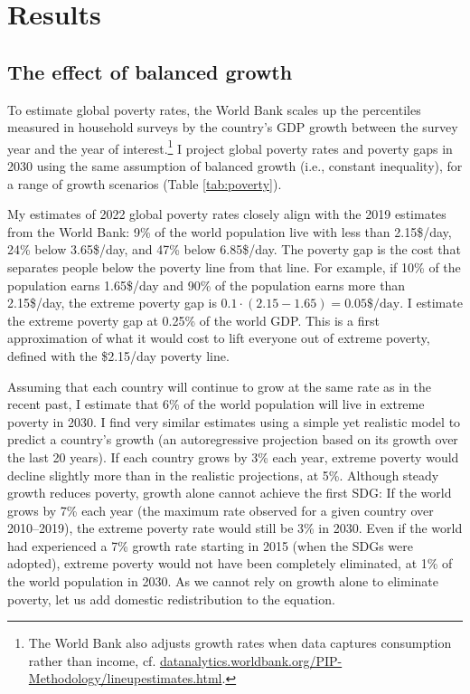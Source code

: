\section{Results}
\subsection{The effect of balanced growth}

To estimate global poverty rates, the World Bank scales up the percentiles measured in household surveys by the country's GDP growth between the survey year and the year of interest.\footnote{The World Bank also adjusts growth rates when data captures consumption rather than income, cf. \href{https://datanalytics.worldbank.org/PIP-Methodology/lineupestimates.html\#extrapolations}{datanalytics.worldbank.org/PIP-Methodology/lineupestimates.html}.} I project global poverty rates and poverty gaps in 2030 using the same assumption of balanced growth (i.e., constant inequality), for a range of growth scenarios (Table \ref{tab:poverty}). 



My estimates of 2022 global poverty rates closely align with the 2019 estimates from the World Bank: 9\% of the world population live with less than 2.15\$/day, 24\% below 3.65\$/day, and 47\% below 6.85\$/day. 
The poverty gap is the cost that separates people below the poverty line from that line. For example, if 10\% of the population earns 1.65\$/day and 90\% of the population earns more than 2.15\$/day, the extreme poverty gap is $0.1 \cdot (2.15 - 1.65) = 0.05\$/\text{day}$. %
I estimate the extreme poverty gap at 0.25\% of the world GDP. This is a first approximation of what it would cost to lift everyone out of extreme poverty, defined with the \$2.15/day poverty line. 

Assuming that each country will continue to grow at the same rate as in the recent past, %
I estimate that 6\% of the world population will live in extreme poverty in 2030. I find very similar estimates using a simple yet realistic model to predict a country's growth (an autoregressive projection based on its growth over the last 20 years). 
If each country grows by 3\% each year, extreme poverty would decline slightly more than in the realistic projections, at 5\%. 
Although steady growth reduces poverty, growth alone cannot achieve the first SDG: If the world grows by 7\% each year (the maximum rate observed for a given country over 2010--2019), %
the extreme poverty rate would still be 3\% in 2030. Even if the world had experienced a 7\% growth rate starting in 2015 (when the SDGs were adopted), extreme poverty would not have been completely eliminated, at 1\% of the world population in 2030. 
As we cannot rely on growth alone to eliminate poverty, let us add domestic redistribution to the equation.

